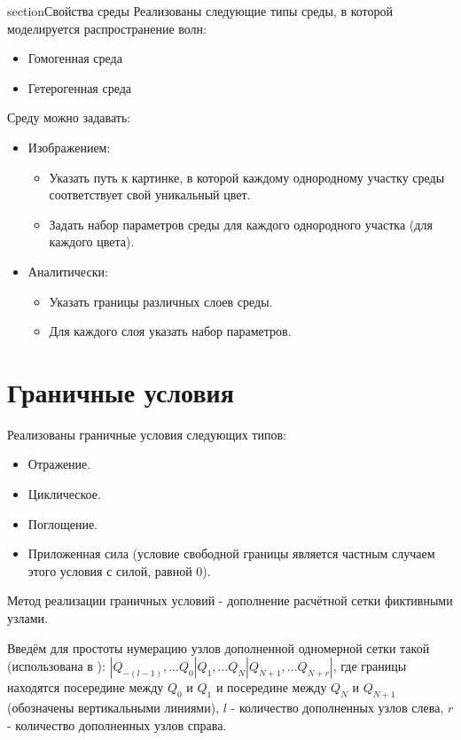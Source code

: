 \documentclass{article}
\begin{document}
section{Свойства среды}
 \indent
Реализованы следующие типы среды, в которой моделируется распространение волн:
\begin{itemize}
\item Гомогенная среда
\item Гетерогенная среда
\end{itemize}
\indent
Среду можно задавать:
\begin{itemize}
\item Изображением:
    \begin{itemize}
    \item Указать путь к картинке, в которой каждому однородному участку среды соответствует свой уникальный цвет.
    \item Задать набор параметров среды для каждого однородного участка (для каждого цвета).
    \end{itemize}
\item Аналитически:
    \begin{itemize}
    \item Указать границы различных слоев среды.
    \item Для каждого слоя указать набор параметров.
    \end{itemize}
\end{itemize}
\indent


\section{Граничные условия}

\indent
Реализованы граничные условия следующих типов:
\begin{itemize}
\item Отражение.
\item Циклическое.
\item Поглощение.
\item Приложенная сила (условие свободной границы является частным случаем этого условия с силой, равной 0).
\end{itemize}

\indent
Метод реализации граничных условий - дополнение расчётной сетки фиктивными узлами.

\indent
Введём для простоты нумерацию узлов дополненной одномерной сетки такой (использована в \cite[глава~7]{finite}): $ \left| Q_{-(l-1)}, ... Q_0 \right| Q_1, ... Q_N \left| Q_{N+1}, ... Q_{N+r} \right|$, где границы находятся посередине между $Q_0$ и $Q_1$ и посередине между $Q_N$ и $Q_{N+1}$ (обозначены вертикальными линиями), $l$ - количество дополненных узлов слева, $r$ - количество дополненных узлов справа.
\end{document}
